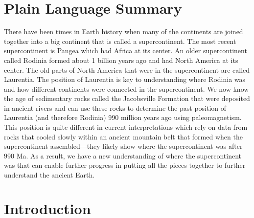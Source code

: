 \documentclass[draft]{agujournal2019}
\begin{document}
\section*{Plain Language Summary}

There have been times in Earth history when many of the continents are joined together into a big continent that is called a supercontinent. The most recent supercontinent is Pangea which had Africa at its center. An older supercontinent called Rodinia formed about 1 billion years ago and had North America at its center. The old parts of North America that were in the supercontinent are called Laurentia. The position of Laurentia is key to understanding where Rodinia was and how different continents were connected in the supercontinent. We now know the age of sedimentary rocks called the Jacobsville Formation that were deposited in ancient rivers and can use these rocks to determine the past position of Laurentia (and therefore Rodinia) 990 million years ago using paleomagnetism. This position is quite different in current interpretations which rely on data from rocks that cooled slowly within an ancient mountain belt that formed when the supercontinent assembled---they likely show where the supercontinent was after 990 Ma. As a result, we have a new understanding of where the supercontinent was that can enable further progress in putting all the pieces together to further understand the ancient Earth.

\section*{Introduction}
\end{document}
